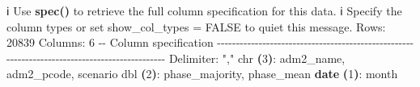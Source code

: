 \documentclass[
  a4paper,
]{article}
\newenvironment{Shaded}{\begin{snugshade}}{\end{snugshade}}
\newcommand{\AttributeTok}[1]{\textcolor[rgb]{0.13,0.29,0.53}{#1}}
\newcommand{\BuiltInTok}[1]{#1}
\newcommand{\ErrorTok}[1]{\textcolor[rgb]{0.64,0.00,0.00}{\textbf{#1}}}
\newcommand{\ExtensionTok}[1]{#1}
\newcommand{\FunctionTok}[1]{\textcolor[rgb]{0.13,0.29,0.53}{\textbf{#1}}}
\newcommand{\KeywordTok}[1]{\textcolor[rgb]{0.13,0.29,0.53}{\textbf{#1}}}
\newcommand{\NormalTok}[1]{#1}
\newcommand{\StringTok}[1]{\textcolor[rgb]{0.31,0.60,0.02}{#1}}
\begin{document}
\begin{Shaded}
\begin{Highlighting}[]
\ExtensionTok{ℹ}\NormalTok{ Use }\KeywordTok{\textasciigrave{}}\FunctionTok{spec()}\KeywordTok{\textasciigrave{}}\NormalTok{ to retrieve the full column specification for this data.}
\ExtensionTok{ℹ}\NormalTok{ Specify the column types or set }\KeywordTok{\textasciigrave{}}\ExtensionTok{show\_col\_types}\NormalTok{ = FALSE}\KeywordTok{\textasciigrave{}}\NormalTok{ to quiet this message.}
\ExtensionTok{Rows:}\NormalTok{ 20839 Columns: 6                                                                                               }
\ExtensionTok{{-}{-}}\NormalTok{ Column specification }\AttributeTok{{-}{-}{-}{-}{-}{-}{-}{-}{-}{-}{-}{-}{-}{-}{-}{-}{-}{-}{-}{-}{-}{-}{-}{-}{-}{-}{-}{-}{-}{-}{-}{-}{-}{-}{-}{-}{-}{-}{-}{-}{-}{-}{-}{-}{-}{-}{-}{-}{-}{-}{-}{-}{-}{-}{-}{-}{-}{-}{-}{-}{-}{-}{-}{-}{-}{-}{-}{-}{-}{-}{-}{-}{-}{-}{-}{-}{-}{-}{-}{-}{-}{-}{-}{-}{-}{-}{-}{-}{-}{-}{-}{-}{-}{-}}
\ExtensionTok{Delimiter:} \StringTok{","}
\ExtensionTok{chr}  \ErrorTok{(}\ExtensionTok{3}\KeywordTok{)}\BuiltInTok{:}\NormalTok{ adm2\_name, adm2\_pcode, scenario}
\ExtensionTok{dbl}  \ErrorTok{(}\ExtensionTok{2}\KeywordTok{)}\BuiltInTok{:}\NormalTok{ phase\_majority, phase\_mean}
\FunctionTok{date} \ErrorTok{(}\ExtensionTok{1}\KeywordTok{)}\BuiltInTok{:}\NormalTok{ month}


\end{Highlighting}
\end{Shaded}
\end{document}
